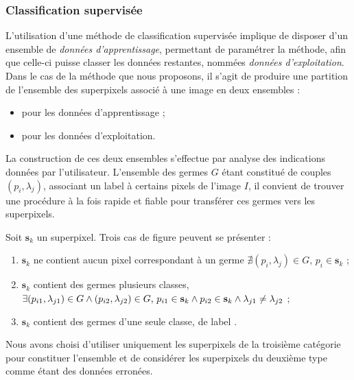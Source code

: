 \subsubsection{Classification supervisée}
L'utilisation d'une méthode de classification supervisée implique de disposer d'un ensemble de \emph{données d'apprentissage}, permettant de paramétrer la méthode, afin que celle-ci puisse classer les données restantes, nommées \emph{données d'exploitation}. Dans le cas de la méthode que nous proposons, il s'agit de produire une partition de l'ensemble des superpixels  associé à une image en deux ensembles : 
\begin{itemize}
\item {} pour les données d'apprentissage ;
\item {} pour les données d'exploitation.
\end{itemize}
La construction de ces deux ensembles s'effectue par analyse des indications données par l'utilisateur. L'ensemble des germes $G$ étant constitué de couples $(p_{i},\lambda_{j})$, associant un label à certains pixels de l'image $I$, il convient de trouver une procédure à la fois rapide et fiable pour transférer ces germes vers les superpixels. 

Soit $\mathbf{s}_{k}$ un superpixel. Trois cas de figure peuvent se présenter :
\begin{enumerate}
\item $\mathbf{s}_{k}$ ne contient aucun pixel correspondant à un germe  $\nexists (p_{i},\lambda_{j}) \in G \text{, } p_{i} \in \mathbf{s}_{k}$ ;
\item $\mathbf{s}_{k}$ contient des germes  plusieurs classes,  ${\exists (p_{i1},\lambda_{j1}) \in G \land   (p_{i2},\lambda_{j2}) \in G \text{, } }\\{p_{i1} \in \mathbf{s}_{k} \land  p_{i2} \in \mathbf{s}_{k} \land  \lambda_{j1} \neq \lambda_{j2}}$ ;
\item $\mathbf{s}_{k}$ contient des germes d'une seule classe, de label .
\end{enumerate}
Nous avons choisi d'utiliser uniquement les superpixels de la troisième catégorie pour constituer l'ensemble   et de considérer les superpixels du deuxième type comme étant des données erronées. 

